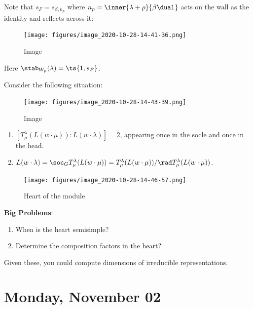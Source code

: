 \begin{remark}

Note that \(s_F = s_{\beta, n_p}\) where
\(n_p = \inner{\lambda + \rho}{\beta\dual}\) acts on the wall as the
identity and reflects across it:

\begin{figure}
\centering
\texttt{[image: figures/image\_2020-10-28-14-41-36.png]}
\caption{Image}
\end{figure}

Here \(\stab_{W_p}(\lambda) = \ts{1, s_F}\).

\end{remark}

\begin{proposition}[?]

Consider the following situation:

\begin{figure}
\centering
\texttt{[image: figures/image\_2020-10-28-14-43-39.png]}
\caption{Image}
\end{figure}

\begin{enumerate}
\def\labelenumi{\arabic{enumi}.}
\item
  \([T_\mu^\lambda (L(w\cdot \mu)) : L(w\cdot \lambda)] = 2\), appearing
  once in the socle and once in the head.
\item
  \(L(w\cdot \lambda) = \soc_G T_\mu^\lambda(L(w\cdot \mu)) = T_\mu^\lambda(L(w\cdot \mu)) / \rad T_\mu^\lambda (L(w\cdot \mu))\).
\end{enumerate}

\begin{figure}
\centering
\texttt{[image: figures/image\_2020-10-28-14-46-57.png]}
\caption{Heart of the module}
\end{figure}

\end{proposition}

\textbf{Big Problems}:

\begin{enumerate}
\def\labelenumi{\arabic{enumi}.}
\item
  When is the heart semisimple?
\item
  Determine the composition factors in the heart?
\end{enumerate}

Given these, you could compute dimensions of irreducible
representations.

\hypertarget{monday-november-02}{%
\section{Monday, November 02}\label{monday-november-02}}

